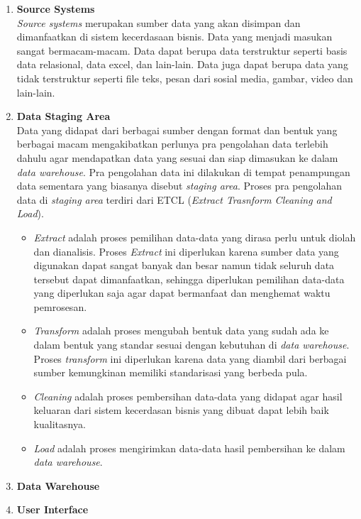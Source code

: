 \begin{enumerate}
	\item \textbf{Source Systems}\\
	\textit{Source systems} merupakan sumber data yang akan disimpan dan dimanfaatkan di sistem kecerdasaan bisnis. Data yang menjadi masukan sangat bermacam-macam. Data dapat berupa data terstruktur seperti basis data relasional, data excel, dan lain-lain. Data juga dapat berupa data yang tidak terstruktur seperti file teks, pesan dari sosial media, gambar, video dan lain-lain.
	
	\item \textbf{Data Staging Area}\\
	Data yang didapat dari berbagai sumber dengan format dan bentuk yang berbagai macam mengakibatkan perlunya pra pengolahan data terlebih dahulu agar mendapatkan data yang sesuai dan siap dimasukan ke dalam \textit{data warehouse}. Pra pengolahan data ini dilakukan di tempat penampungan data sementara yang biasanya disebut \textit{staging area}. Proses pra pengolahan data di \textit{staging area} terdiri dari ETCL (\textit{Extract Trasnform Cleaning and Load}).
		\begin{itemize}
			\item \textit{Extract} adalah proses pemilihan data-data yang dirasa perlu untuk diolah dan dianalisis. Proses \textit{Extract} ini diperlukan karena sumber data yang digunakan dapat sangat banyak dan besar namun tidak seluruh data tersebut dapat dimanfaatkan, sehingga diperlukan pemilihan data-data yang diperlukan saja agar dapat bermanfaat dan menghemat waktu pemrosesan.
			\item \textit{Transform} adalah proses mengubah bentuk data yang sudah ada ke dalam bentuk yang standar sesuai dengan kebutuhan di \textit{data warehouse}. Proses \textit{transform} ini diperlukan karena data yang diambil dari berbagai sumber kemungkinan memiliki standarisasi yang berbeda pula.
			\item \textit{Cleaning} adalah proses pembersihan data-data yang didapat agar hasil keluaran dari sistem kecerdasan bisnis yang dibuat dapat lebih baik kualitasnya.
			\item \textit{Load} adalah proses mengirimkan data-data hasil pembersihan ke dalam \textit{data warehouse}.
		\end{itemize}
	
	\item \textbf{Data Warehouse}
		
	
	\item \textbf{User Interface}
\end{enumerate} 


